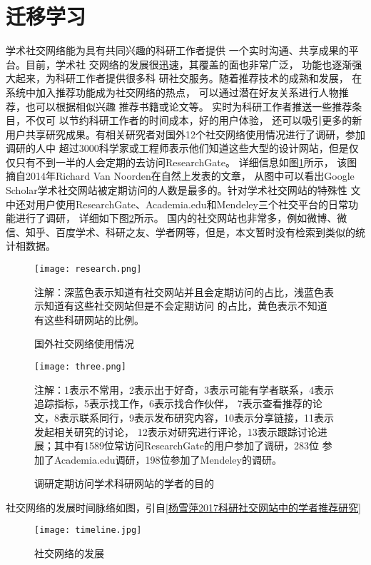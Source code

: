 \section{迁移学习}
学术社交网络能为具有共同兴趣的科研工作者提供%
一个实时沟通、共享成果的平台。目前，学术社%
交网络的发展很迅速，其覆盖的面也非常广泛，%
功能也逐渐强大起来，为科研工作者提供很多科%
研社交服务。随着推荐技术的成熟和发展，%
在系统中加入推荐功能成为社交网络的热点，%
可以通过潜在好友关系进行人物推荐，也可以根据相似兴趣%
推荐书籍或论文等。
实时为科研工作者推送一些推荐条目，不仅可%
以节约科研工作者的时间成本，好的用户体验，%
还可以吸引更多的新用户共享研究成果。有相关研究者对国外12个社交网络使用情况进行了调研，参加调研的人中%
超过3000科学家或工程师表示他们知道这些大型的设计网站，但是仅仅只有不到一半的人会定期的去访问ResearchGate。%
详细信息如图\ref{fig:research}所示，%
该图摘自2014年Richard Van Noorden在自然上发表的文章，
从图中可以看出Google Scholar学术社交网站被定期访问的人数是最多的。针对学术社交网站的特殊性%
文中还对用户使用ResearchGate、Academia.edu和Mendeley三个社交平台的日常功能进行了调研，%
详细如下图\ref{fig:three}所示。
国内的社交网站也非常多，例如微博、微信、知乎、百度学术、科研之友、学者网等，但是，本文暂时没有检索到类似的统计相数据。
\begin{figure}[htbp] %
  \centering
  \texttt{[image: research.png]}
  \caption{国外社交网络使用情况}
  \label{fig:research}
  \footnotesize
  注解：深蓝色表示知道有社交网站并且会定期访问的占比，浅蓝色表示知道有这些社交网站但是不会定期访问%
  的占比，黄色表示不知道有这些科研网站的比例。
\end{figure}
\begin{figure}[htbp] %
  \centering
  \texttt{[image: three.png]}
  \caption{调研定期访问学术科研网站的学者的目的}
  \label{fig:three}
  \footnotesize
  注解：1表示不常用，2表示出于好奇，3表示可能有学者联系，4表示追踪指标，5表示找工作，6表示找合作伙伴，%
  7表示查看推荐的论文，8表示联系同行，9表示发布研究内容，10表示分享链接，11表示发起相关研究的讨论，%
  12表示对研究进行评论，13表示跟踪讨论进展；其中有1589位常访问ResearchGate的用户参加了调研，283位%
  参加了Academia.edu调研，198位参加了Mendeley的调研。
\end{figure}

社交网络的发展时间脉络如图，引自\ref{杨雪萍2017科研社交网站中的学者推荐研究}
\begin{figure}[htbp] %
  \centering
  \texttt{[image: timeline.jpg]}
  \caption{社交网络的发展}
  \label{fig:academic_time}
\end{figure}

